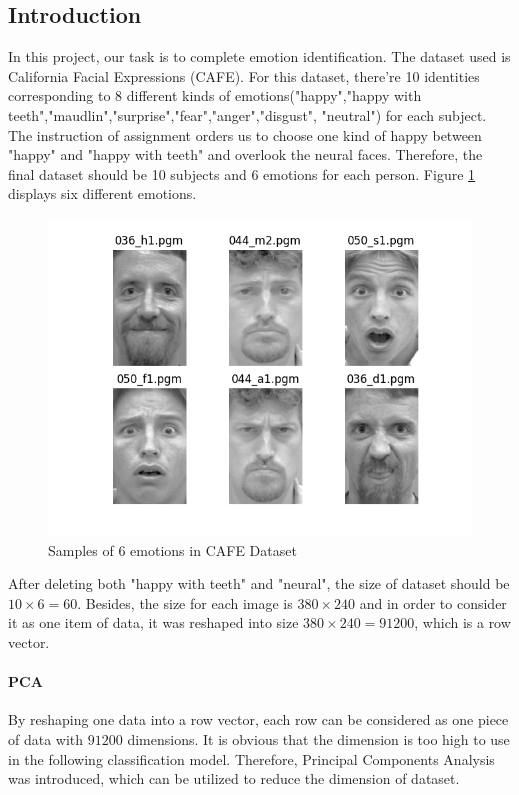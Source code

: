 \documentclass{article}
\begin{document}
\subsection{Introduction}
In this project, our task is to complete emotion identification. The dataset used is California Facial Expressions (CAFE). For this dataset, there're 10 identities corresponding to 8 different kinds of emotions("happy","happy with teeth","maudlin","surprise","fear","anger","disgust", "neutral") for each subject. The instruction of assignment orders us to choose one kind of happy between "happy" and "happy with teeth" and overlook the neural faces. Therefore, the final dataset should be 10 subjects and 6 emotions for each person. Figure \ref{figure: sixemotion} displays six different emotions.
\begin{figure}[ht]
\begin{center}
\includegraphics[scale=0.5]{images/six_face.png}
\end{center}
\caption{Samples of 6 emotions in CAFE Dataset}
\label{figure: sixemotion}
\end{figure}
After deleting both "happy with teeth" and "neural", the size of dataset should be $10\times6=60$. Besides, the size for each image is $380\times240$ and in order to consider it as one item of data, it was reshaped into size $380 \times 240 = 91200$, which is a row vector.
\paragraph{PCA} By reshaping one data into a row vector, each row can be considered as one piece of data with $91200$ dimensions. It is obvious that the dimension is too high to use in the following classification model. Therefore, Principal Components Analysis was introduced, which can be utilized to reduce the dimension of dataset.
\end{document}
